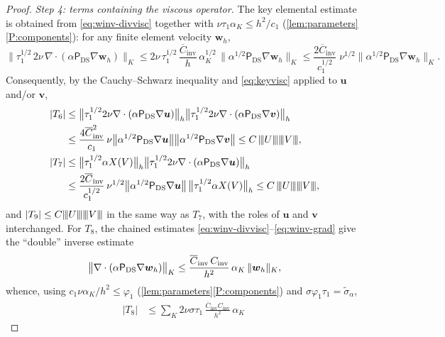 \documentclass[11pt,a4paper]{article}
\newcommand{\bu}{\boldsymbol{u}}
\newcommand{\bv}{\boldsymbol{v}}
\newcommand{\ViscProj}{\mathsf{P}_{\mathrm{DS}}}
\newcommand{\X}{X}
\newcommand{\Cinv}{C_{\mathrm{inv}}}
\newcommand{\Cinva}{\overline{C}_{\mathrm{inv}}}
\DeclarePairedDelimiter{\norm}{\lVert}{\rVert}
\newcommand{\triplenorm}[1]{{\lvert\kern-0.25ex\lvert\kern-0.25ex\lvert #1
\rvert\kern-0.25ex\rvert\kern-0.25ex\rvert}}
\newcommand{\sigmatilde}{\widetilde{\sigma}_{\alpha}}
\theoremstyle{plain}
\theoremstyle{remark}
\theoremstyle{definition}
\numberwithin{equation}{section}
\begin{document}
\begin{proof}
\medskip\noindent\emph{Step 4: terms containing the viscous operator.}
The key elemental estimate is obtained from \eqref{eq:winv-divvisc} together with
$\nu\tau_1\alpha_K\le h^2/c_1$ (\cref{lem:parameters}\ref{P:components}): for any finite
element velocity $\boldsymbol{w}_h$,
\begin{equation}\label{eq:keyvisc}
  \bigl\lVert\tau_1^{1/2}\,2\nu\,
  \nabla\cdot(\alpha\ViscProj\nabla\boldsymbol{w}_h)\bigr\rVert_{K}
  \le 2\nu\,\tau_1^{1/2}\,\frac{\Cinva}{h}\,\alpha_K^{1/2}\,
  \bigl\lVert\alpha^{1/2}\ViscProj\nabla\boldsymbol{w}_h\bigr\rVert_{K}
  \le \frac{2\Cinva}{c_1^{1/2}}\;\nu^{1/2}
  \bigl\lVert\alpha^{1/2}\ViscProj\nabla\boldsymbol{w}_h\bigr\rVert_{K}.
\end{equation}
Consequently, by the Cauchy--Schwarz inequality and \eqref{eq:keyvisc} applied to $\bu$
and/or $\bv$,
\begin{align}
  |T_6| &\le
  \bigl\lVert\tau_1^{1/2}2\nu\nabla\cdot(\alpha\ViscProj\nabla\bu)\bigr\rVert_h
  \bigl\lVert\tau_1^{1/2}2\nu\nabla\cdot(\alpha\ViscProj\nabla\bv)\bigr\rVert_h \nonumber\\
  &\le \frac{4\Cinva^2}{c_1}\,
  \nu\bigl\lVert\alpha^{1/2}\ViscProj\nabla\bu\bigr\rVert
  \bigl\lVert\alpha^{1/2}\ViscProj\nabla\bv\bigr\rVert
  \le C\,\triplenorm{U}\triplenorm{V}, \label{eq:T6bound}\\
  |T_7| &\le
  \bigl\lVert\tau_1^{1/2}\alpha\X(V)\bigr\rVert_h
  \bigl\lVert\tau_1^{1/2}2\nu\nabla\cdot(\alpha\ViscProj\nabla\bu)\bigr\rVert_h \nonumber\\
  &\le \frac{2\Cinva}{c_1^{1/2}}\,
  \nu^{1/2}\bigl\lVert\alpha^{1/2}\ViscProj\nabla\bu\bigr\rVert\,
  \bigl\lVert\tau_1^{1/2}\alpha\X(V)\bigr\rVert_h
  \le C\,\triplenorm{U}\triplenorm{V}, \label{eq:T7bound}
\end{align}
and $|T_9|\le C\triplenorm{U}\triplenorm{V}$ in the same way as $T_7$, with the roles of
$\bu$ and $\bv$ interchanged. For $T_8$, the chained estimates
\eqref{eq:winv-divvisc}--\eqref{eq:winv-grad} give the ``double'' inverse estimate
\begin{equation}\label{eq:doubleinv}
  \bigl\lVert\nabla\cdot(\alpha\ViscProj\nabla\boldsymbol{w}_h)\bigr\rVert_{K}
  \le \frac{\Cinva\,\Cinv}{h^2}\,\alpha_K\,\norm{\boldsymbol{w}_h}_{K},
\end{equation}
whence, using $c_1\nu\alpha_K/h^2\le\varphi_1$ (\cref{lem:parameters}\ref{P:components})
and $\sigma\varphi_1\tau_1=\sigmatilde$,
\begin{align}
  |T_8|
  &\le \sum_{K} 2\nu\sigma\tau_1\,\frac{\Cinva\Cinv}{h^2}\,\alpha_K\,

\end{align}
\end{proof}
\end{document}
